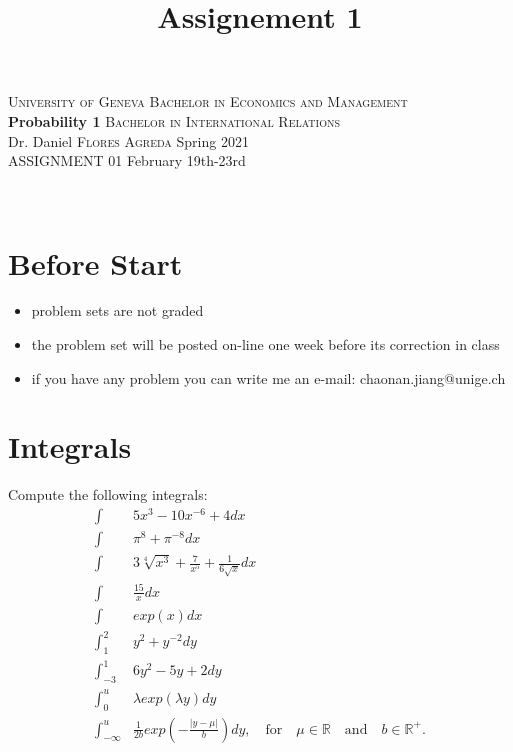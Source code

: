 \documentclass[12pt,a4paper,titlepage]{article}\usepackage[]{graphicx}\usepackage[]{color}
\title{Assignement 1}
\begin{document}
\noindent \textsc{University of Geneva}     \hfill \textsc{Bachelor in Economics and Management} \\
\textbf{Probability 1}                      \hfill \textsc{Bachelor in International Relations} \\
Dr. Daniel \textsc{Flores Agreda}                 \hfill Spring 2021  \\
ASSIGNMENT 01                               \hfill   February 19th-23rd

\noindent
\makebox[\linewidth]{\rule{\textwidth}{0.4pt}}\\[1.5ex]
\section*{Before Start}
\begin{itemize}
\item problem sets are not graded
\item the problem set will be posted on-line one week before its correction in class
\item if you have any problem you can write me an e-mail: chaonan.jiang@unige.ch
\end{itemize}






\section{Integrals}


Compute the following integrals: \\
\begin{align*}
\int& 5x^{3}-10x^{-6}+4 dx \\
\int&  \pi^{8}+\pi^{-8} dx \\
\int& 3\sqrt[4]{x^{3}}+\frac{7}{x^{5}}+\frac{1}{6\sqrt{x}}dx \\
\int& \frac{15}{x}dx \\
\int & exp(x)dx\\
\int_{1}^{2}& y^{2}+y^{-2}dy \\
\int_{-3}^{1}& 6y^{2}-5y+2dy \\
\int_{0}^{u}& \lambda exp(\lambda y) dy \\
\int_{-\infty}^{u}& \frac{1}{2b} exp\left (-\frac{|y-\mu|}{b}\right) dy, \quad \text{for} \quad \mu \in \mathbb{R} \quad \text{and} \quad b \in \mathbb{R}^{+}.
\end{align*}
\end{document}
